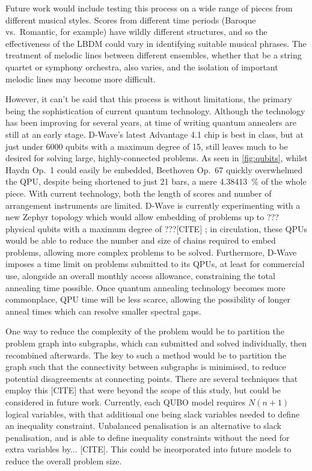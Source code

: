 \documentclass[12pt]{article}
\theoremstyle{definition}
\begin{document}
Future work would include testing this process on a wide range of pieces from different musical styles. Scores from different time periods (Baroque vs.\ Romantic, for example) have wildly different structures, and so the effectiveness of the LBDM could vary in identifying suitable musical phrases. The treatment of melodic lines between different ensembles, whether that be a string quartet or symphony orchestra, also varies, and the isolation of important melodic lines may become more difficult.

However, it can't be said that this process is without limitations, the primary being the sophistication of current quantum technology. Although the technology has been improving for several years, at time of writing quantum annealers are still at an early stage. D-Wave's latest Advantage 4.1 chip is best in class, but at just under \num{6000} qubits with a maximum degree of \num{15}, still leaves much to be desired for solving large, highly-connected problems. As seen in \cref{fig:qubits}, whilst Haydn Op.\ 1 could easily be embedded, Beethoven Op.\ 67 quickly overwhelmed the QPU, despite being shortened to just \num{21} bars, a mere \qty{4.38413}{\%} of the whole piece. With current technology, both the length of scores and number of arrangement instruments are limited. D-Wave is currently experimenting with a new Zephyr topology which would allow embedding of problems up to ??? physical qubits with a maximum degree of ???[CITE] ; in circulation, these QPUs would be able to reduce the number and size of chains required to embed problems, allowing more complex problems to be solved.
Furthermore, D-Wave imposes a time limit on problems submitted to its QPUs, at least for commercial use, alongside an overall monthly access allowance, constraining the total annealing time possible. Once quantum annealing technology becomes more commonplace, QPU time will be less scarce, allowing the possibility of longer anneal times which can resolve smaller spectral gaps.

One way to reduce the complexity of the problem would be to partition the problem graph into subgraphs, which can submitted and solved individually, then recombined afterwards. The key to such a method would be to partition the graph such that the connectivity between subgraphs is minimised, to reduce potential disagreements at connecting points. There are several techniques that employ this [CITE] that were beyond the scope of this study, but could be considered in future work.
Currently, each QUBO model requires $N(n+1)$ logical variables, with that additional one being slack variables needed to define an inequality constraint. Unbalanced penalisation is an alternative to slack penalisation, and is able to define inequality constraints without the need for extra variables by... [CITE]. This could be incorporated into future models to reduce the overall problem size.
\end{document}
